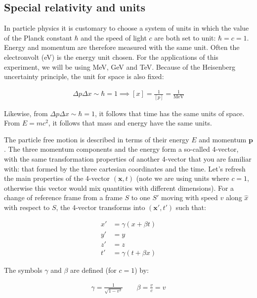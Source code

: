\subsection{Special relativity and units}

In particle physics it is customary to choose a system of units in which the value of the Planck constant $\hbar$ and the speed of light $c$ are both set to unit: $\hbar = c = 1$. Energy and momentum are therefore measured with the same unit. Often the electronvolt (eV) is the energy unit chosen. For the applications of this experiment, we will be using MeV, GeV and TeV. Because of the Heisenberg uncertainty principle, the unit for space is also fixed: 

\begin{align*}
\Delta p \Delta x \sim \hbar = 1 \implies [x] = \frac{1}{[p]}  = \frac{1}{\mathrm{MeV}}
\end{align*}

Likewise, from $\Delta p \Delta x \sim \hbar = 1$, it follows that time has the same units of space. From $E=mc^2$, it follows that mass and energy have the same units. 


The particle free motion is described in terms of their energy $E$ and momentum $\mathbf{p}$. The three momentum components and the energy form a so-called 4-vector, with the same transformation properties of another 4-vector that you are familiar with: that formed by the three cartesian coordinates and the time. Let's refresh the main properties of the 4-vector $(\mathbf{x},t)$ (note we are using units where $c = 1$, otherwise this vector would mix quantities with different dimensions). For a change of reference frame from a frame $S$ to one $S'$ moving with speed $v$ along $\hat{x}$ with respect to $S$, the 4-vector transforms into $(\mathbf{x'},t')$ such that:

\begin{align}
x' &= \gamma \left(x + \beta t\right) \nonumber \\
y' &= y \nonumber \\
z' &= z \nonumber\\
t' &= \gamma \left(t + \beta x\right)
\end{align}
\label{eq:lorentz_transform}

The symbols $\gamma$ and $\beta$ are defined (for $c=1$) by: 

\begin{align*}
\gamma = \frac{1}{\sqrt{1-v^2}} \qquad \beta = \frac{v}{c} = v
\end{align*}

